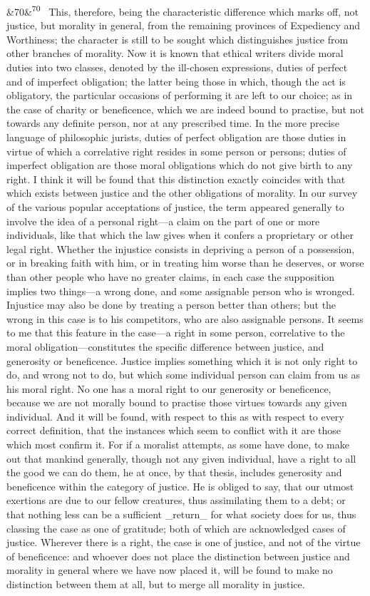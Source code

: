 \documentclass[12pt]{article}
\newcommand{\para}[1][]{\par\noindent\ifx&#1&\else\textsuperscript{\footnotesize #1}~\fi}
\begin{document}
\para[70] This, therefore, being the characteristic difference which marks off, not justice, but morality in general, from the remaining provinces of Expediency and Worthiness; the character is still to be sought which distinguishes justice from other branches of morality. Now it is known that ethical writers divide moral duties into two classes, denoted by the ill-chosen expressions, duties of perfect and of imperfect obligation; the latter being those in which, though the act is obligatory, the particular occasions of performing it are left to our choice; as in the case of charity or beneficence, which we are indeed bound to practise, but not towards any definite person, nor at any prescribed time. In the more precise language of philosophic jurists, duties of perfect obligation are those duties in virtue of which a correlative right resides in some person or persons; duties of imperfect obligation are those moral obligations which do not give birth to any right. I think it will be found that this distinction exactly coincides with that which exists between justice and the other obligations of morality. In our survey of the various popular acceptations of justice, the term appeared generally to involve the idea of a personal right---a claim on the part of one or more individuals, like that which the law gives when it confers a proprietary or other legal right. Whether the injustice consists in depriving a person of a possession, or in breaking faith with him, or in treating him worse than he deserves, or worse than other people who have no greater claims, in each case the supposition implies two things---a wrong done, and some assignable person who is wronged. Injustice may also be done by treating a person better than others; but the wrong in this case is to his competitors, who are also assignable persons. It seems to me that this feature in the case---a right in some person, correlative to the moral obligation---constitutes the specific difference between justice, and generosity or beneficence. Justice implies something which it is not only right to do, and wrong not to do, but which some individual person can claim from us as his moral right. No one has a moral right to our generosity or beneficence, because we are not morally bound to practise those virtues towards any given individual. And it will be found, with respect to this as with respect to every correct definition, that the instances which seem to conflict with it are those which most confirm it. For if a moralist attempts, as some have done, to make out that mankind generally, though not any given individual, have a right to all the good we can do them, he at once, by that thesis, includes generosity and beneficence within the category of justice. He is obliged to say, that our utmost exertions are due to our fellow creatures, thus assimilating them to a debt; or that nothing less can be a sufficient \_return\_ for what society does for us, thus classing the case as one of gratitude; both of which are acknowledged cases of justice. Wherever there is a right, the case is one of justice, and not of the virtue of beneficence: and whoever does not place the distinction between justice and morality in general where we have now placed it, will be found to make no distinction between them at all, but to merge all morality in justice.
\end{document}
